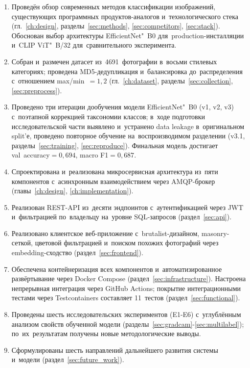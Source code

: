 \documentclass[a4paper,12pt]{diplom}
\begin{document}
\begin{enumerate}[label=\arabic{enumi})]
\item Проведён обзор современных методов классификации изображений, существующих программных продуктов-аналогов и~технологического стека (гл.~\ref{ch:design}, разделы~\ref{sec:methods}, \ref{sec:competitors}, \ref{sec:stack}). Обоснован выбор архитектуры EfficientNet"~B0 для~production-инсталляции и~CLIP ViT"~B/32 для~сравнительного эксперимента.
\item Собран и~размечен датасет из~4691~фотографии в~восьми стилевых категориях; проведена MD5-дедупликация и~балансировка до~распределения с~отношением max/min~$=1{,}2$ (гл.~\ref{ch:dataset}, разделы~\ref{sec:collection}, \ref{sec:preprocess}).
\item Проведено три итерации дообучения модели EfficientNet"~B0 (v1, v2, v3) с~поэтапной коррекцией таксономии классов; в~ходе подготовки исследовательской части выявлено и~устранено data leakage в~оригинальном split'е, проведено повторное обучение на~воспроизводимом разделении (v3.1, разделы~\ref{sec:training}, \ref{sec:reproduce}). Финальная модель достигает val~accuracy$=0{,}694$, macro F1$=0{,}687$.
\item Спроектирована и~реализована микросервисная архитектура из~пяти компонентов с~асинхронным взаимодействием через AMQP-брокер (главы~\ref{ch:design}, \ref{ch:implementation}).
\item Реализован REST-API из~десяти эндпоинтов с~аутентификацией через JWT и~фильтрацией по~владельцу на~уровне SQL-запросов (раздел~\ref{sec:api}).
\item Реализовано клиентское веб-приложение с~brutalist-дизайном, masonry-сеткой, цветовой фильтрацией и~поиском похожих фотографий через embedding-сходство (раздел~\ref{sec:frontend}).
\item Обеспечена контейнеризация всех компонентов и~автоматизированное развёртывание через Docker Compose (раздел~\ref{sec:infrastructure}). Настроена непрерывная интеграция через GitHub Actions; покрытие интеграционными тестами через Testcontainers составляет 11~тестов (раздел~\ref{sec:functional}).
\item Проведены шесть исследовательских экспериментов (E1-E6) с~углублённым анализом свойств обученной модели (разделы~\ref{sec:gradcam}-\ref{sec:multilabel}); по~их~результатам получены новые методологические выводы.
\item Сформулированы шесть направлений дальнейшего развития системы и~модели (раздел~\ref{sec:future_work}).
\end{enumerate}
\end{document}
